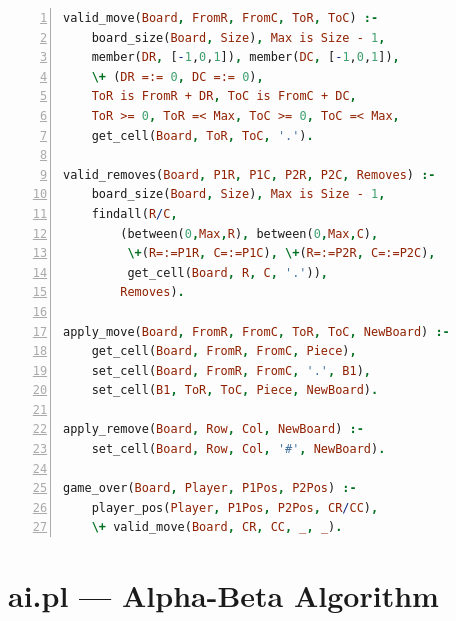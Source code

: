 \begin{lstlisting}[language=Prolog,
    caption={rules.pl --- move validation and application},
    label={lst:rules_full},
    numbers=left,
    basicstyle=\footnotesize\ttfamily,
    frame=single]
valid_move(Board, FromR, FromC, ToR, ToC) :-
    board_size(Board, Size), Max is Size - 1,
    member(DR, [-1,0,1]), member(DC, [-1,0,1]),
    \+ (DR =:= 0, DC =:= 0),
    ToR is FromR + DR, ToC is FromC + DC,
    ToR >= 0, ToR =< Max, ToC >= 0, ToC =< Max,
    get_cell(Board, ToR, ToC, '.').

valid_removes(Board, P1R, P1C, P2R, P2C, Removes) :-
    board_size(Board, Size), Max is Size - 1,
    findall(R/C,
        (between(0,Max,R), between(0,Max,C),
         \+(R=:=P1R, C=:=P1C), \+(R=:=P2R, C=:=P2C),
         get_cell(Board, R, C, '.')),
        Removes).

apply_move(Board, FromR, FromC, ToR, ToC, NewBoard) :-
    get_cell(Board, FromR, FromC, Piece),
    set_cell(Board, FromR, FromC, '.', B1),
    set_cell(B1, ToR, ToC, Piece, NewBoard).

apply_remove(Board, Row, Col, NewBoard) :-
    set_cell(Board, Row, Col, '#', NewBoard).

game_over(Board, Player, P1Pos, P2Pos) :-
    player_pos(Player, P1Pos, P2Pos, CR/CC),
    \+ valid_move(Board, CR, CC, _, _).
\end{lstlisting}

\section{ai.pl --- Alpha-Beta Algorithm}

